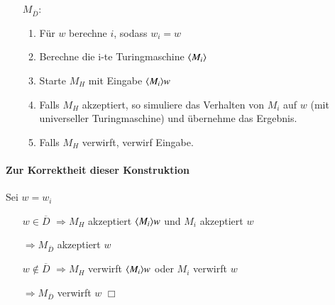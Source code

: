 \begin{itemize}
	\item[$M_{\overline{D}}$:] \begin{enumerate}
		\item Für $w$ berechne $i$, sodass $w_i=w$
		\item Berechne die i-te  Turingmaschine $\langle M_i \rangle$ 
		\item Starte $M_H$ mit Eingabe $\langle M_i \rangle w$
		\item Falls $M_H$ akzeptiert, so simuliere das Verhalten von $M_i$ auf $w$ (mit universeller Turingmaschine) und übernehme das Ergebnis.
		\item Falls $M_H$ verwirft, verwirf Eingabe.
	\end{enumerate}
\end{itemize}

\paragraph*{Zur Korrektheit dieser Konstruktion} Sei $w=w_i$
\begin{itemize}
	\item[$w\in\overline{D}$] $\Rightarrow M_H$ akzeptiert $\langle M_i \rangle w$ und $M_i$ akzeptiert $w$
	\item[] $\Rightarrow M_{\overline{D}}$ akzeptiert $w$
	\item[$w\not\in\overline{D}$] $\Rightarrow M_H$ verwirft $\langle M_i \rangle w$ oder $M_i$ verwirft $w$
	\item[] $\Rightarrow M_{\overline{D}}$ verwirft $w$ \hspace{1cm} $\Box$
\end{itemize}